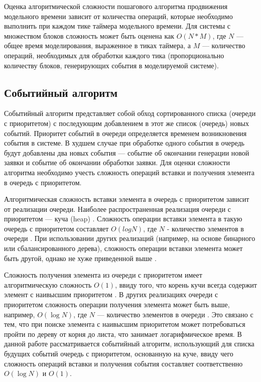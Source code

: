Оценка алгоритмической сложности пошагового алгоритма продвижения модельного времени зависит от количества операций, которые необходимо выполнить при каждом тике таймера модельного времени. Для системы с множеством блоков сложность может быть оценена как $O(N*M)$, где $N$ --- общее время моделирования, выраженное в тиках таймера, а $M$ --- количество операций, необходимых для обработки каждого тика (пропорционально количеству блоков, генерирующих события в моделируемой системе).

\subsection{Событийный алгоритм}
Событийный алгоритм представляет собой обход сортированного списка (очереди с приоритетом) с последующим добавлением в этот же список (очередь) новых событий. Приоритет событий в очереди определяется временем возникновения события в системе.
В худшем случае при обработке одного события в очередь будут добавлены два новых события --- событие об окончании генерации новой заявки и событие об окончании обработки заявки. Для оценки сложности алгоритма необходимо учесть сложность операций вставки и получения элемента в очередь с приоритетом.


Алгоритмическая сложность вставки элемента в очередь с приоритетом зависит от реализации очереди. Наиболее распространенная реализация очереди с приоритетом  --- куча (heap) \cite{priority_queue_implementation}. Сложность операции вставки элемента в такую очередь с приоритетом составляет $O(log N)$, где $N$ - количество элементов в очереди \cite{priority_queue_complexity}. При использовании других реализаций (например, на основе бинарного или сбалансированного дерева), сложность операции вставки элемента может быть другой, однако не хуже приведенной выше  \cite{priority_queue_implementation}.


Сложность получения элемента из очереди с приоритетом имеет алгоритмическую сложность $O(1)$, ввиду того, что корень кучи всегда содержит элемент с наивысшим приоритетом \cite{priority_queue_implementation}.
В других реализациях очереди с приоритетом сложность операции получения элемента может быть выше, например, $O(\log{N})$, где $N$ --- количество элементов в очереди \cite{priority_queue_implementation}. Это связано с тем, что при поиске элемента с наивысшим приоритетом может потребоваться пройти по дереву от корня до листа, что занимает логарифмическое время.
В данной работе рассматривается событийный алгоритм, использующий для списка будущих событий очередь с приоритетом, основанную на куче, ввиду чего сложность операций вставки и получения события составляет соответственно $O(\log{N})$ и $O(1)$.


